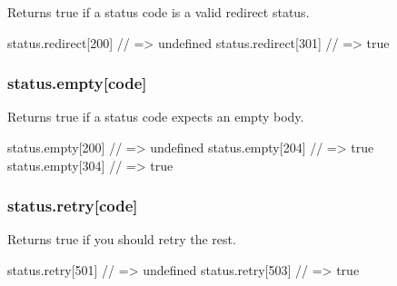 Returns {\ttfamily true} if a status code is a valid redirect status.


\begin{DoxyCode}
status.redirect[200] // => undefined
status.redirect[301] // => true
\end{DoxyCode}


\subsubsection*{status.\+empty\mbox{[}code\mbox{]}}

Returns {\ttfamily true} if a status code expects an empty body.


\begin{DoxyCode}
status.empty[200] // => undefined
status.empty[204] // => true
status.empty[304] // => true
\end{DoxyCode}


\subsubsection*{status.\+retry\mbox{[}code\mbox{]}}

Returns {\ttfamily true} if you should retry the rest.


\begin{DoxyCode}
status.retry[501] // => undefined
status.retry[503] // => true
\end{DoxyCode}
 